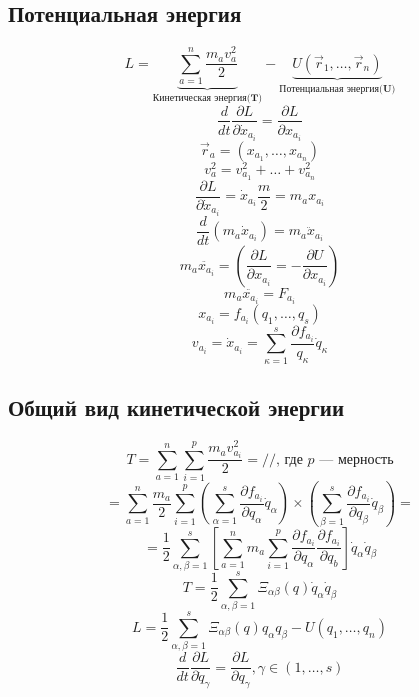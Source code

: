 \documentclass[a4paper, 12pt, titlepage, fleqn]{article}
\newcommand{\T}{\textbf}
\newcommand{\D}{\partial}
\newcommand{\Where}{\T{, где }}
\begin{document}
	 	\subsection{Потенциальная энергия}
		 	\[
			 	L = \underbrace{\sum\limits_{a = 1}^{n}\frac{m_a v_a^2}{2}}_{\T{Кинетическая энергия(T)}} - \underbrace{U(\vec{r}_1, \dots, \vec{r}_n)}_{\T{Потенциальная энергия(U)}}
		 	\]
		 	\[
			 	\frac{d}{dt}\frac{\D L}{\D \dot{x}_{a_i}} = \frac{\D L}{\D x_{a_i}}
		 	\]
		 	\[
			 	\vec{r}_a = (x_{a_1}, \dots, x_{a_n})
			\]
			\[
				v^2_a = v^2_{a_1} + \dots + v^2_{a_n}
			\]
			\[
				\frac{\D L}{\D \dot{x}_{a_i}} = \dot{x}_{a_i}\frac{m}{2} = m_a x_{a_i}
			\]
			\[
				\frac{d}{dt}(m_a\dot{x}_{a_i}) = m_a\ddot{x}_{a_i}
			\]
			\[
				m_a\ddot{x_{a_i}} = \left(\frac{\D L}{\D x_{a_i}} = -\frac{\D U}{\D x_{a_i}}\right)
			\]
			\[
				m_a\ddot{x_{a_i}} = F_{a_i}
			\]
			\[
				x_{a_i} = f_{a_i}(q_1, \dots, q_s)
			\]
			\[
				v_{a_i} = \dot{x}_{a_i} = \sum\limits_{\kappa = 1}^s\frac{\D f_{a_i}}{q_\kappa}\dot{q}_\kappa
			\]
		\subsection{Общий вид кинетической энергии}
			\[
				T = \sum\limits_{a = 1}^n\sum\limits_{i = 1}^p\frac{m_a v^2_{a_i}}{2} =// \Where p \T{ --- мерность}
			\]
			\[
				= \sum\limits_{a = 1}^n\frac{m_a}{2}\sum\limits_{i = 1}^p\left(\sum\limits_{\alpha = 1}^{s}\frac{\D f_{a_i}}{\D q_\alpha}\dot{q}_\alpha\right)\times\left(\sum\limits_{\beta = 1}^s\frac{\D f_{a_i}}{\D q_\beta}\dot{q}_\beta\right) =
			\]
			\[
				= \frac{1}{2}\sum\limits_{\alpha, \beta = 1}^s\left[\sum\limits_{a = 1}^n m_a \sum\limits_{i = 1}^p \frac{\D f_{a_i}}{\D q_\alpha}\frac{\D f_{a_i}}{\D q_b} \right]\dot{q}_\alpha\dot{q}_\beta
			\]
			\[
				T = \frac{1}{2}\sum\limits_{\alpha, \beta = 1}^s\Xi_{\alpha\beta}(q)\dot{q}_\alpha\dot{q}_\beta
			\]
			\[
				L = \frac{1}{2}\sum\limits_{\alpha, \beta = 1}^{s}\Xi_{\alpha\beta}(q)q_\alpha q_\beta - U(q_1, \dots, q_n)
			\]
			\[
				\frac{d}{dt}\frac{\D L}{\D \dot{q}_\gamma} = \frac{\D L}{\D q_\gamma}, \gamma \in (1, \dots, s)
			\]
\end{document}
